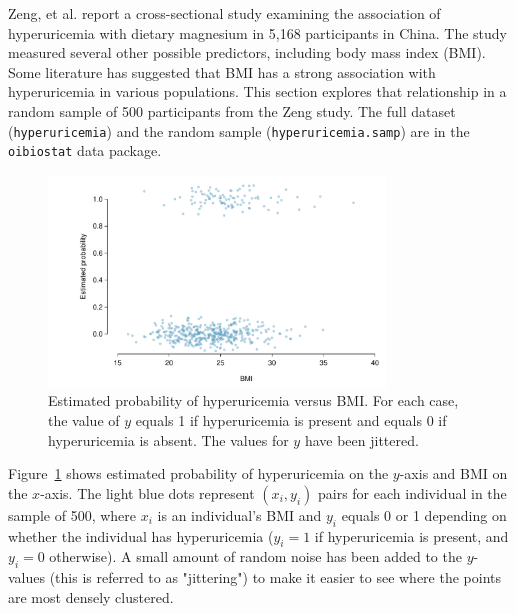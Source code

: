 Zeng, et al. report a cross-sectional study examining the association of hyperuricemia with dietary magnesium in 5,168 participants in China. The study measured several other possible predictors, including body mass index (BMI).  Some literature has suggested that BMI has a strong association with hyperuricemia in various populations. This section explores that relationship in a random sample of 500 participants from the Zeng study. The full dataset (\texttt{hyperuricemia}) and the random sample (\texttt{hyperuricemia.samp}) are in the \texttt{oibiostat} data package.


 \begin{figure}[h!]
 	\centering
 	\includegraphics[width=0.80\textwidth]
 	{ch_logistic_regression_oi_biostat/figures/bmiHuProbSecondTile/bmiHuProbSecondTileDataOnly.pdf}
     \caption{Estimated probability of hyperuricemia versus BMI. For each case, the value of $y$ equals 1 if hyperuricemia is present and equals 0 if hyperuricemia is absent. The values for $y$ have been jittered.}
     \label{figure:bmiHuProbSecondTileDataOnly}
 \end{figure}


Figure~\ref{figure:bmiHuProbSecondTileDataOnly} shows estimated probability of hyperuricemia on the $y$-axis and BMI on the $x$-axis. The light blue dots represent $(x_i, y_i)$ pairs for each individual in the sample of 500, where $x_i$ is an individual's BMI and $y_i$ equals 0 or 1 depending on whether the individual has hyperuricemia ($y_i= 1$ if hyperuricemia is present, and $y_i = 0$ otherwise). A small amount of random noise has been added to the $y$-values (this is referred to as "jittering") to make it easier to see where the points are most densely clustered.

